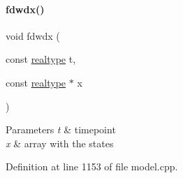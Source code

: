 \paragraph{\texorpdfstring{fdwdx()}{fdwdx()}\hspace{0.1cm}{\footnotesize\ttfamily [1/2]}}
{\footnotesize\ttfamily void fdwdx (\begin{DoxyParamCaption}\item[{const \mbox{\hyperlink{namespaceamici_a1bdce28051d6a53868f7ccbf5f2c14a3}{realtype}}}]{t,  }\item[{const \mbox{\hyperlink{namespaceamici_a1bdce28051d6a53868f7ccbf5f2c14a3}{realtype}} $\ast$}]{x }\end{DoxyParamCaption})}


\begin{DoxyParams}{Parameters}
{\em t} & timepoint \\
\hline
{\em x} & array with the states \\
\hline
\end{DoxyParams}


Definition at line 1153 of file model.\+cpp.

